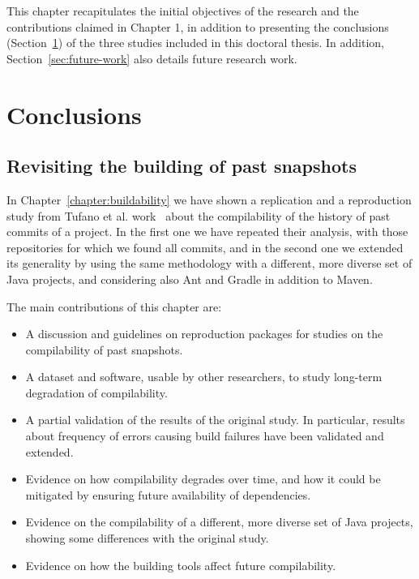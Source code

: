 This chapter recapitulates the initial objectives of the research and the contributions claimed in Chapter 1, in addition to presenting the conclusions (Section~\ref{sec:conclusions}) of the three studies included in this doctoral thesis. 
In addition, Section~\ref{sec:future-work} also details future research work.

\section{Conclusions}
\label{sec:conclusions}

\subsection{Revisiting the building of past snapshots}

In Chapter~\ref{chapter:buildability} we have shown a replication and a reproduction study from Tufano et al. work~\cite{tufano2017there} about the compilability of the history of past commits of a project. 
In the first one we have repeated their analysis, with those repositories for which we found all commits, and in the second one we extended its generality by using the same methodology with a different, more diverse set of Java projects, and considering also Ant and Gradle in addition to Maven.

The main contributions of this chapter are:

\begin{itemize}
\item A discussion and guidelines on reproduction packages for studies on the compilability of past snapshots. 
\item A dataset and software, usable by other researchers, to study long-term degradation of compilability.
\item A partial validation of the results of the original study. In particular, results about frequency of errors causing build failures have been validated and extended.
\item Evidence on how compilability degrades over time, and how it could be mitigated by ensuring future availability of dependencies.
\item Evidence on the compilability of a different, more diverse set of Java projects, showing some differences with the original study.
\item Evidence on how the building tools affect future compilability.
\end{itemize}

